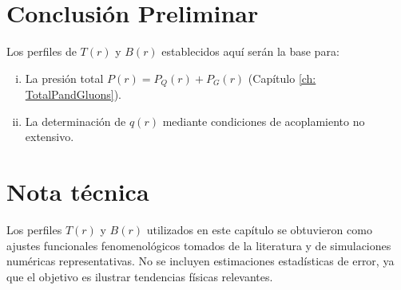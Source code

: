 \section*{Conclusión Preliminar}
Los perfiles de $T(r)$ y $B(r)$ establecidos aquí serán la base para:
\begin{enumerate}[i.]
    \item La presión total $P(r) = P_Q(r) + P_G(r)$ (Capítulo \ref{ch: TotalPandGluons}).
    \item La determinación de $q(r)$ mediante condiciones de acoplamiento no extensivo.
\end{enumerate}

\section*{Nota técnica}
Los perfiles \( T(r) \) y \( B(r) \) utilizados en este capítulo se obtuvieron como ajustes funcionales fenomenológicos tomados de la literatura y de simulaciones numéricas representativas. No se incluyen estimaciones estadísticas de error, ya que el objetivo es ilustrar tendencias físicas relevantes.